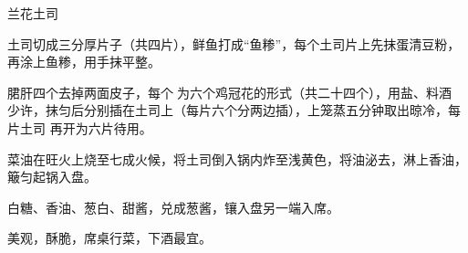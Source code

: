 \begin{recipe}{兰花土司}

\ingredients


\preparation

\step 土司切成三分厚片子（共四片），鲜鱼打成“鱼糁”，每个土司片上先抹蛋清豆粉，
再涂上鱼糁，用手抹平整。

\step 𬂁肝四个去掉两面皮子，每个𠟤为六个鸡冠花的形式（共二十四个），用盐、料酒
少许，抹匀后分别插在土司上（每片六个分两边插），上笼蒸五分钟取出晾冷，每片土司
再开为六片待用。

\step 菜油在旺火上烧至七成火候，将土司倒入锅内炸至浅黄色，将油泌去，淋上香油，
簸匀起锅入盘。

\step 白糖、香油、葱白、甜酱，兑成葱酱，镶入盘另一端入席。

\features

美观，酥脆，席桌行菜，下酒最宜。

\end{recipe}

